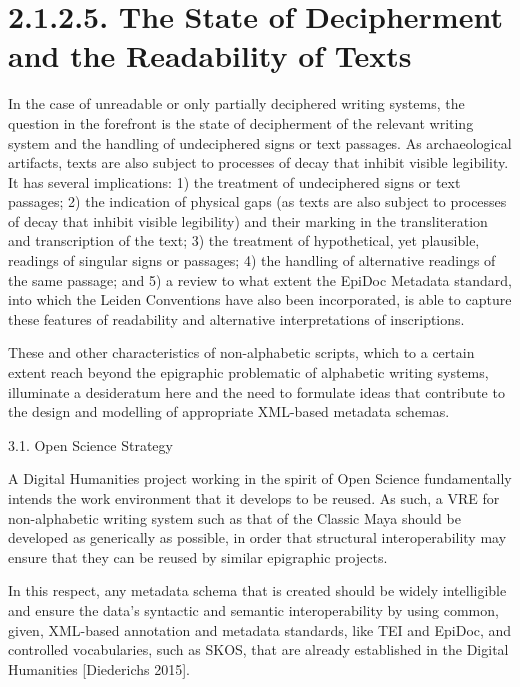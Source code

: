 \documentclass[amsthm,ebook]{saparticle}
\begin{document}
\clearpage\section[2.1.2.5. The State of Decipherment and the Readability of Texts ]{2.1.2.5. The State of Decipherment
and the Readability of Texts }
In the case of unreadable or only partially deciphered writing systems, the question in the forefront is the state of
decipherment of the relevant writing system and the handling of undeciphered signs or text passages. As archaeological
artifacts, texts are also subject to processes of decay that inhibit visible legibility. It has several implications:
1) the treatment of undeciphered signs or text passages; 2) the indication of physical gaps (as texts are also subject
to processes of decay that inhibit visible legibility) and their marking in the transliteration and transcription of
the text; 3) the treatment of hypothetical, yet plausible, readings of singular signs or passages; 4) the handling of
alternative readings of the same passage; and 5) a review to what extent the EpiDoc Metadata standard, into which the
Leiden Conventions have also been incorporated, is able to capture these features of readability and alternative
interpretations of inscriptions.

These and other characteristics of non-alphabetic scripts, which to a certain extent reach beyond the epigraphic
problematic of alphabetic writing systems, illuminate a desideratum here and the need to formulate ideas that
contribute to the design and modelling of appropriate XML-based metadata schemas. 


\bigskip

3.1. Open Science Strategy 

A Digital Humanities project working in the spirit of Open Science fundamentally intends the work environment that it
develops to be reused. As such, a VRE for non-alphabetic writing system such as that of the Classic Maya should be
developed as generically as possible, in order that structural interoperability may ensure that they can be reused by
similar epigraphic projects.

In this respect, any metadata schema that is created should be widely intelligible and ensure the data’s syntactic and
semantic interoperability by using common, given, XML-based annotation and metadata standards, like TEI and EpiDoc, and
controlled vocabularies, such as SKOS, that are already established in the Digital Humanities [Diederichs 2015].
\end{document}
